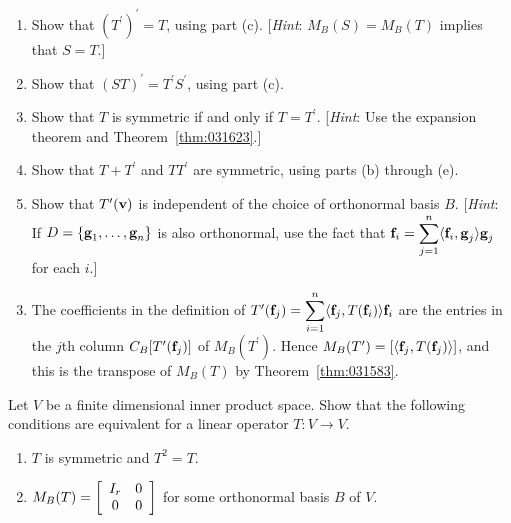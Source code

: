 \begin{multicols}{2}
\begin{ex}
\begin{enumerate}[label={\alph*.}]
\item Show that $(T^\prime)^\prime = T$, using part (c). [\textit{Hint}: $M_{B}(S) = M_{B}(T)$ implies that $S = T$.]

\item Show that $(ST)^\prime = T^\prime S^\prime$, using part (c).

\item Show that $T$ is symmetric if and only if \newline $T = T^\prime$. [\textit{Hint}: Use the expansion theorem and Theorem~\ref{thm:031623}.]

\item Show that $T + T^\prime$ and $TT^\prime$ are symmetric, using parts (b) through (e).

\item Show that $T^\prime(\textbf{v})$ is independent of the choice of orthonormal basis $B$. [\textit{Hint}: If $D = \{\textbf{g}_{1}, \dots, \textbf{g}_{n}\}$ is also orthonormal, use the fact that \newline $\textbf{f}_i = \displaystyle \sum_{j = 1}^{n} \langle \textbf{f}_i, \textbf{g}_j \rangle \textbf{g}_j$ for each $i$.]

\end{enumerate}
\begin{sol}
\begin{enumerate}[label={\alph*.}]
\setcounter{enumi}{2}
\item  The coefficients in the definition of $T^\prime(\textbf{f}_j) = \displaystyle \sum_{i = 1}^{n} \langle \textbf{f}_j, T(\textbf{f}_i) \rangle \textbf{f}_i$ are the entries in the $j$th column $C_{B}[T^\prime(\textbf{f}_{j})]$ of $M_{B}(T^\prime)$. Hence $M_{B}(T^\prime) = [\langle\textbf{f}_{j}, T(\textbf{f}_{j}) \rangle]$, and this is the transpose of $M_{B}(T)$ by Theorem~\ref{thm:031583}.
\end{enumerate}
\end{sol}
\end{ex}

\begin{ex} \label{ex:10_3_15}
Let $V$ be a finite dimensional inner product space. Show that the following conditions are equivalent for a linear operator $T : V \to V$.

\begin{enumerate}
\item $T$ is symmetric and $T^{2} = T$.

\item $M_B(T) = 
\left[ \begin{array}{cc}
I_r & 0 \\
0 & 0
\end{array} \right]$ for some orthonormal basis $B$ of $V$.


\end{enumerate}
\end{ex}
\end{multicols}
